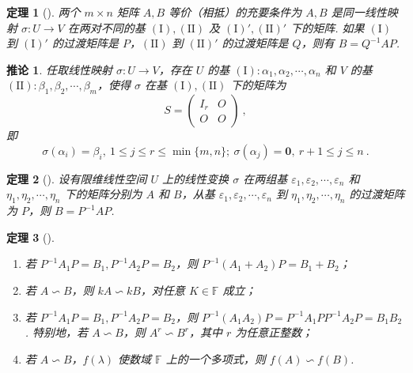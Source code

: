 \documentclass[zihao=-4,UTF8,linespread=1.8,nothm]{aytony_base}
\newtheorem{theorem}{\indent 定理}[subsection]
\newtheorem*{corollary}{\indent 推论}
\begin{document}
\begin{theorem}[]
    两个 $m \times n$ 矩阵 $A, B$ 等价（相抵）的充要条件为 $A, B$ 是同一线性映射 $\sigma:U \to V$ 在两对不同的基 $(\mathrm{I}), (\mathrm{II})$ 及 $\mathrm{(I)', (II)'}$ 下的矩阵. 如果 $\mathrm{(I)}$ 到 $\mathrm{(I)}'$ 的过渡矩阵是 $P$，$(\mathrm{II})$ 到 $\mathrm{(II)'}$ 的过渡矩阵是 $Q$，则有 $B = Q^{-1}AP$.
\end{theorem}

\begin{corollary}
    任取线性映射 $\sigma: U \to V$，存在 $U$ 的基 $\mathrm{(I)}: {\alpha}_1, {\alpha}_2, \cdots, {\alpha}_{n}$ 和 $V$ 的基 $\mathrm{(II)}: {\beta}_1, {\beta}_2, \cdots, {\beta}_{m}$，使得 $\sigma$ 在基 $\mathrm{(I), (II)}$ 下的矩阵为 $$
        S = \left(
        \begin{matrix}
                I_r & O \\
                O   & O
            \end{matrix}
        \right)\ ,
    $$ 即 $$
        \sigma(\alpha_i) = \beta_i,\ 1 \leqslant j \leqslant r \leqslant \min\{m, n\};\ \sigma(\alpha_j) = \mathbf{0},\ r+1 \leqslant j \leqslant n\ .
    $$
\end{corollary}

\begin{theorem}[]
    设有限维线性空间 $U$ 上的线性变换 $\sigma$ 在两组基 ${\varepsilon}_1, {\varepsilon}_2, \cdots, {\varepsilon}_{n}$ 和 ${\eta}_1, {\eta}_2, \cdots, {\eta}_{n}$ 下的矩阵分别为 $A$ 和 $B$，从基 ${\varepsilon}_1, {\varepsilon}_2, \cdots, {\varepsilon}_{n}$ 到 ${\eta}_1, {\eta}_2, \cdots, {\eta}_{n}$ 的过渡矩阵为 $P$，则 $B = P^{-1}AP$.
\end{theorem}

\begin{theorem}[]
    \begin{enumerate}[nosep]
        \item 若 $P^{-1}A_1P = B_1, P^{-1}A_2P = B_2$，则 $P^{-1}(A_1 + A_2)P = B_1 + B_2$；
        \item 若 $A \backsim B$，则 $kA \backsim kB$，对任意 $K \in \mathbb{F} $ 成立；
        \item 若 $P^{-1}A_1P = B_1, P^{-1}A_2P = B_2$，则 $P^{-1}(A_1A_2)P = P^{-1}A_1PP^{-1}A_2P = B_1B_2$. 特别地，若 $A \backsim B$，则 $A^r \backsim B^r$，其中 $r$ 为任意正整数；
        \item 若 $A \backsim B$，$f(\lambda)$ 使数域 $\mathbb{F}$ 上的一个多项式，则 $f(A) \backsim f(B)$.
    \end{enumerate}
\end{theorem}
\end{document}
